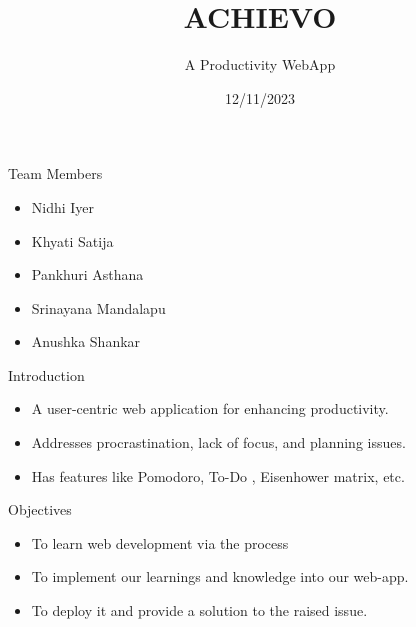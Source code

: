\documentclass{beamer}
\title{ACHIEVO}
\subtitle{A Productivity WebApp}
\institute[Program]{
        \inst{Women Engineers}
        \inst{TalentSprint}
}
\date{12/11/2023}
\begin{document}
\begin{frame}
  \maketitle
\end{frame}

\begin{frame}{Team Members}
    \begin{itemize}
        \item Nidhi Iyer
        \item Khyati Satija
        \item Pankhuri Asthana
        \item Srinayana Mandalapu
        \item Anushka Shankar
    \end{itemize}
\end{frame}

\begin{frame}{Introduction}
    \begin{itemize}
        \item A user-centric web application for enhancing productivity.
        \item Addresses procrastination, lack of focus, and planning issues.
        \item Has features like Pomodoro, To-Do , Eisenhower matrix, etc.
    \end{itemize}
\end{frame}

\begin{frame}{Objectives}
    \begin{itemize}
        \item To learn web development via the process
        \item To implement our learnings and knowledge into our web-app.
        \item To deploy it and provide a solution to the raised issue.
    \end{itemize}
\end{frame}

\end{document}
